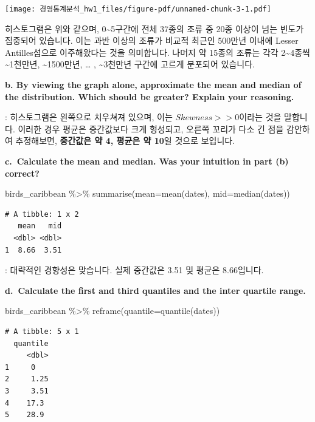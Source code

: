 \documentclass[
  letterpaper,
  DIV=11,
  numbers=noendperiod]{scrreprt}
\newenvironment{Shaded}{\begin{snugshade}}{\end{snugshade}}
\newcommand{\AttributeTok}[1]{\textcolor[rgb]{0.40,0.45,0.13}{#1}}
\newcommand{\FunctionTok}[1]{\textcolor[rgb]{0.28,0.35,0.67}{#1}}
\newcommand{\NormalTok}[1]{\textcolor[rgb]{0.00,0.23,0.31}{#1}}
\newcommand{\SpecialCharTok}[1]{\textcolor[rgb]{0.37,0.37,0.37}{#1}}
\begin{document}
\texttt{[image: 경영통계분석\_hw1\_files/figure-pdf/unnamed-chunk-3-1.pdf]}

히스토그램은 위와 같으며, 0\textasciitilde5구간에 전체 37종의 조류 중
20종 이상이 넘는 빈도가 집중되어 있습니다. 이는 과반 이상의 조류가
비교적 최근인 500만년 이내에 Lesser Antilles섬으로 이주해왔다는 것을
의미합니다. 나머지 약 15종의 조류는 각각 2\textasciitilde4종씩
\textasciitilde1천만년, \textasciitilde1500만년, \ldots{} ,
\textasciitilde3천만년 구간에 고르게 분포되어 있습니다.

\textbf{b. By viewing the graph alone, approximate the mean and median
of the distribution. Which should be greater? Explain your reasoning.}

: 히스토그램은 왼쪽으로 치우쳐져 있으며, 이는 \(Skewness>>0\)이라는 것을
말합니다. 이러한 경우 평균은 중간값보다 크게 형성되고, 오른쪽 꼬리가
다소 긴 점을 감안하여 추정해보면, \textbf{중간값은 약 4, 평균은 약 10}일
것으로 보입니다.

\textbf{c.~Calculate the mean and median. Was your intuition in part (b)
correct?}

\begin{Shaded}
\begin{Highlighting}[]
\NormalTok{birds\_caribbean }\SpecialCharTok{\%\textgreater{}\%} 
  \FunctionTok{summarise}\NormalTok{(}\AttributeTok{mean=}\FunctionTok{mean}\NormalTok{(dates),}
            \AttributeTok{mid=}\FunctionTok{median}\NormalTok{(dates))}
\end{Highlighting}
\end{Shaded}

\begin{verbatim}
# A tibble: 1 x 2
   mean   mid
  <dbl> <dbl>
1  8.66  3.51
\end{verbatim}

: 대략적인 경향성은 맞습니다. 실제 중간값은 3.51 및 평균은 8.66입니다.

\textbf{d.~Calculate the first and third quantiles and the inter
quartile range.}

\begin{Shaded}
\begin{Highlighting}[]
\NormalTok{birds\_caribbean }\SpecialCharTok{\%\textgreater{}\%} 
  \FunctionTok{reframe}\NormalTok{(}\AttributeTok{quantile=}\FunctionTok{quantile}\NormalTok{(dates))}
\end{Highlighting}
\end{Shaded}

\begin{verbatim}
# A tibble: 5 x 1
  quantile
     <dbl>
1     0   
2     1.25
3     3.51
4    17.3 
5    28.9 
\end{verbatim}
\end{document}
